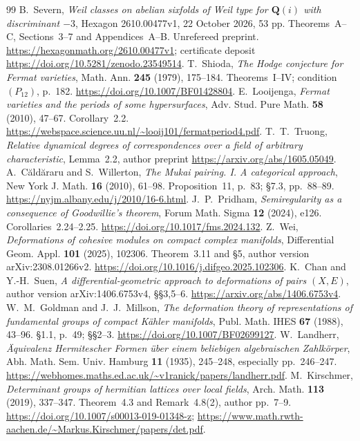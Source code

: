 \documentclass[11pt]{article}
\theoremstyle{definition}
\theoremstyle{remark}
\newcommand{\Q}{\mathbf Q}
\begin{document}
\begin{thebibliography}{99}
 B.~Severn,
\emph{Weil classes on abelian sixfolds of Weil type for $\Q(i)$ with
discriminant $-3$}, Hexagon 2610.00477v1, 22 October 2026, 53 pp.
Theorems~A--C, Sections~3--7 and Appendices~A--B. Unrefereed preprint.
\url{https://hexagonmath.org/2610.00477v1}; certificate deposit
\url{https://doi.org/10.5281/zenodo.23549514}.
 T.~Shioda, \emph{The Hodge conjecture for Fermat
varieties}, Math. Ann. \textbf{245} (1979), 175--184. Theorems~I--IV;
condition $(P_{12})$, p.~182. \url{https://doi.org/10.1007/BF01428804}.
 E.~Looijenga, \emph{Fermat varieties and the
periods of some hypersurfaces}, Adv. Stud. Pure Math. \textbf{58}
(2010), 47--67. Corollary~2.2.
\url{https://webspace.science.uu.nl/~looij101/fermatperiod4.pdf}.
 T.~T.~Truong, \emph{Relative dynamical degrees
of correspondences over a field of arbitrary characteristic},
Lemma~2.2, author preprint \url{https://arxiv.org/abs/1605.05049}.
 A.~C\u{a}ld\u{a}raru and S.~Willerton,
\emph{The Mukai pairing. I. A categorical approach},
New York J. Math. \textbf{16} (2010), 61--98. Proposition~11,
p.~83; \S7.3, pp.~88--89.
\url{https://nyjm.albany.edu/j/2010/16-6.html}.
 J.~P.~Pridham, \emph{Semiregularity as a consequence
of Goodwillie's theorem}, Forum Math. Sigma \textbf{12} (2024), e126.
Corollaries~2.24--2.25. \url{https://doi.org/10.1017/fms.2024.132}.
 Z.~Wei, \emph{Deformations of cohesive modules
on compact complex manifolds}, Differential Geom. Appl.
\textbf{101} (2025), 102306. Theorem~3.11 and \S5, author version
arXiv:2308.01266v2. \url{https://doi.org/10.1016/j.difgeo.2025.102306}.
 K.~Chan and Y.-H.~Suen,
\emph{A differential-geometric approach to deformations of pairs
$(X,E)$}, author version arXiv:1406.6753v4, \S\S3,5--6.
\url{https://arxiv.org/abs/1406.6753v4}.
 W.~M.~Goldman and J.~J.~Millson,
\emph{The deformation theory of representations of fundamental groups
of compact K\"ahler manifolds}, Publ. Math. IHES \textbf{67}
(1988), 43--96. \S1.1, p.~49; \S\S2--3.
\url{https://doi.org/10.1007/BF02699127}.
 W.~Landherr,
\emph{\"Aquivalenz Hermitescher Formen \"uber einem beliebigen
algebraischen Zahlk\"orper}, Abh. Math. Sem. Univ. Hamburg
\textbf{11} (1935), 245--248, especially pp.~246--247.
\url{https://webhomes.maths.ed.ac.uk/~v1ranick/papers/landherr.pdf}.
 M.~Kirschmer,
\emph{Determinant groups of hermitian lattices over local fields},
Arch. Math. \textbf{113} (2019), 337--347.
Theorem~4.3 and Remark~4.8(2), author pp.~7--9.
\url{https://doi.org/10.1007/s00013-019-01348-z};
\url{https://www.math.rwth-aachen.de/~Markus.Kirschmer/papers/det.pdf}.
\end{thebibliography}
\end{document}
